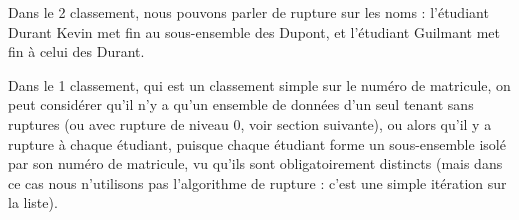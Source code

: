 	
	Dans le 2\ieme{} classement, nous pouvons parler de
	rupture sur les noms : l’étudiant Durant Kevin met fin au sous-ensemble
	des Dupont, et l’étudiant Guilmant met fin à celui des Durant.
		
	Dans le 1\ier{} classement, qui est un classement simple
	sur le numéro de matricule, on peut considérer qu’il n’y a qu’un
	ensemble de données d’un seul tenant sans ruptures (ou avec rupture de niveau 0, voir section suivante), ou alors qu’il y a
	rupture à chaque étudiant, puisque chaque étudiant forme un
	sous-ensemble isolé par son numéro de matricule, vu qu’ils sont
	obligatoirement distincts (mais dans ce cas nous n'utilisons pas 
        l'algorithme de rupture : c'est une simple itération sur la liste).
	
	


